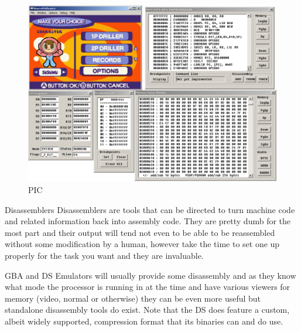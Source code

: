 \documentclass[
]{book}
\begin{document}
\begin{figure}
\centering
\includegraphics{images/17_home_fast6191_romhackingguide_unrenamed_file___ackingguideemulatorshowcaseboycottadvance_1.png}
\caption{PIC}
\end{figure}

Disassemblers Disassemblers are tools that can be directed to turn machine code and related information back into assembly code. They are pretty dumb for the most part and their output will tend not even to be able to be reassembled without some modification by a human, however take the time to set one up properly for the task you want and they are invaluable.

GBA and DS Emulators will usually provide some disassembly and as they know what mode the processor is running in at the time and have various viewers for memory (video, normal or otherwise) they can be even more useful but standalone disassembly tools do exist. Note that the DS does feature a custom, albeit widely supported, compression format that its binaries can and do use.
\end{document}
